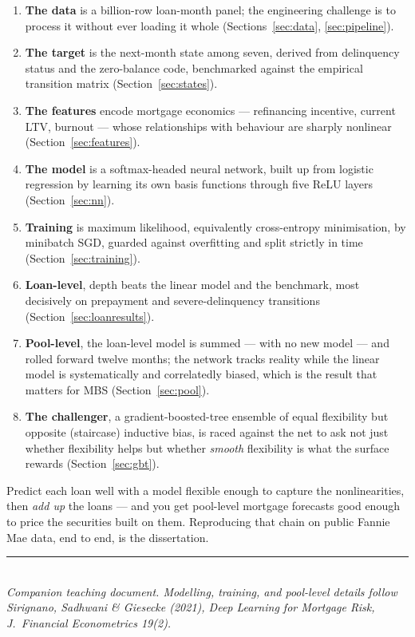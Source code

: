\documentclass[11pt]{article}
\begin{document}
\begin{enumerate}[leftmargin=1.6em, itemsep=3pt]
  \item \textbf{The data} is a billion-row loan-month panel; the engineering challenge is to
        process it without ever loading it whole (Sections~\ref{sec:data},
        \ref{sec:pipeline}).
  \item \textbf{The target} is the next-month state among seven, derived from delinquency
        status and the zero-balance code, benchmarked against the empirical transition matrix
        (Section~\ref{sec:states}).
  \item \textbf{The features} encode mortgage economics --- refinancing incentive, current
        LTV, burnout --- whose relationships with behaviour are sharply nonlinear
        (Section~\ref{sec:features}).
  \item \textbf{The model} is a softmax-headed neural network, built up from logistic
        regression by learning its own basis functions through five ReLU layers
        (Section~\ref{sec:nn}).
  \item \textbf{Training} is maximum likelihood, equivalently cross-entropy minimisation, by
        minibatch SGD, guarded against overfitting and split strictly in time
        (Section~\ref{sec:training}).
  \item \textbf{Loan-level}, depth beats the linear model and the benchmark, most decisively
        on prepayment and severe-delinquency transitions (Section~\ref{sec:loanresults}).
  \item \textbf{Pool-level}, the loan-level model is summed --- with no new model --- and
        rolled forward twelve months; the network tracks reality while the linear model is
        systematically and correlatedly biased, which is the result that matters for MBS
        (Section~\ref{sec:pool}).
  \item \textbf{The challenger}, a gradient-boosted-tree ensemble of equal flexibility but
        opposite (staircase) inductive bias, is raced against the net to ask not just whether
        flexibility helps but whether \emph{smooth} flexibility is what the surface rewards
        (Section~\ref{sec:gbt}).
\end{enumerate}

\begin{keyidea}
Predict each loan well with a model flexible enough to capture the nonlinearities, then
\emph{add up} the loans --- and you get pool-level mortgage forecasts good enough to price the
securities built on them. Reproducing that chain on public Fannie Mae data, end to end, is the
dissertation.
\end{keyidea}

\vfill
\begin{center}
\small\color{softrule}\rule{0.5\linewidth}{0.6pt}\\[4pt]
{\color{ink}\itshape Companion teaching document.
Modelling, training, and pool-level details follow Sirignano, Sadhwani \& Giesecke (2021),
\emph{Deep Learning for Mortgage Risk}, J.\ Financial Econometrics 19(2).}
\end{center}
\end{document}
